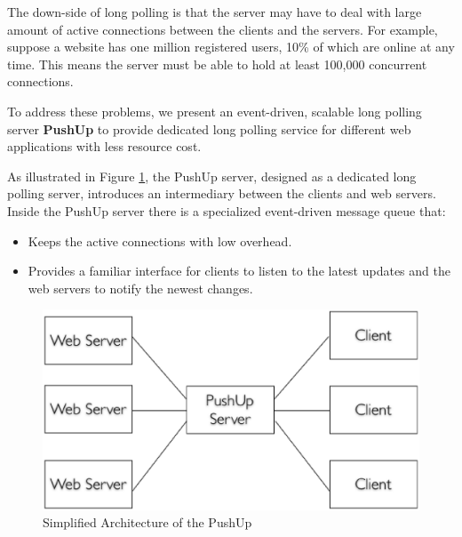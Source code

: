 The down-side of long polling is that the server may have to deal with large
amount of active connections between the clients and the servers. For example,
suppose a website has one million registered users, 10\% of which are online at any 
time. This means the server must be able to hold at least 100,000 concurrent 
connections.

To address these problems, we present an event-driven, scalable
long polling server \textbf{PushUp} to provide dedicated long polling service for 
different web applications with less resource cost.

As illustrated in Figure \ref{fig:sim_pushup}, the PushUp server, designed
as a dedicated long polling server, introduces an intermediary between
the clients and web servers. Inside the PushUp server there is a specialized 
event-driven message queue that:
\begin {itemize}
    \item[1] Keeps the active connections with low overhead.
    \item[2] Provides a familiar interface for clients to listen to the latest 
             updates and the web servers to notify the newest changes.
\end {itemize}


\begin{figure}[htb!]
\centering
    \includegraphics[scale=0.40]{figures/sim_pushup.eps}
    \caption{Simplified Architecture of the PushUp}
    \label{fig:sim_pushup}
\end{figure}
